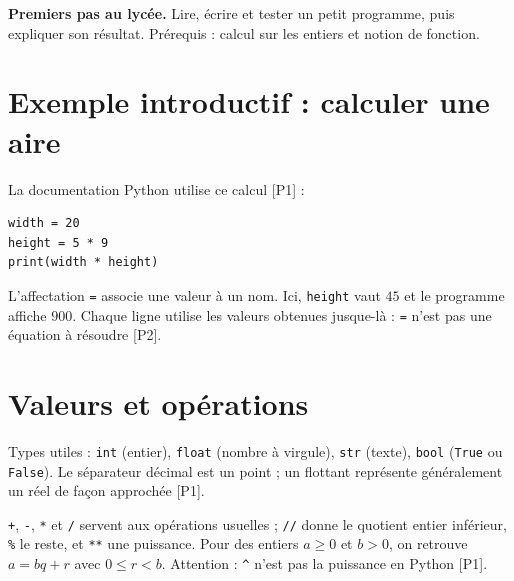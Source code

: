 \documentclass[11pt]{article}
\begin{document}

\textbf{Premiers pas au lycée.} Lire, écrire et tester un petit programme, puis expliquer son résultat. Prérequis : calcul sur les entiers et notion de fonction.

\begin{center}
\end{center}



\section{Exemple introductif : calculer une aire}\label{sec:exemple}
La documentation Python utilise ce calcul [P1] :
\begin{verbatim}
width = 20
height = 5 * 9
print(width * height)
\end{verbatim}
L'affectation \texttt{=} associe une valeur à un nom. Ici, \texttt{height} vaut $45$ et le programme affiche $900$. Chaque ligne utilise les valeurs obtenues jusque-là : \texttt{=} n'est pas une équation à résoudre [P2].

\section{Valeurs et opérations}\label{sec:valeurs}
Types utiles : \texttt{int} (entier), \texttt{float} (nombre à virgule), \texttt{str} (texte), \texttt{bool} (\texttt{True} ou \texttt{False}). Le séparateur décimal est un point ; un flottant représente généralement un réel de façon approchée [P1].

\texttt{+}, \texttt{-}, \texttt{*} et \texttt{/} servent aux opérations usuelles ; \texttt{//} donne le quotient entier inférieur, \texttt{\%} le reste, et \texttt{**} une puissance. Pour des entiers $a\ge0$ et $b>0$, on retrouve $a=bq+r$ avec $0\le r<b$. Attention : \texttt{\textasciicircum} n'est pas la puissance en Python [P1].
\end{document}
